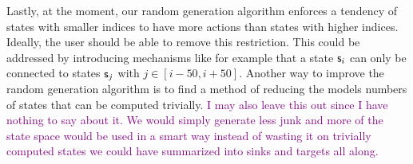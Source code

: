 Lastly, at the moment, our random generation algorithm enforces a tendency of states with smaller indices to have more actions than states with higher indices.
Ideally, the user should be able to remove this restriction.
This could be addressed by introducing mechanisms like for example that a state $\mathsf{s}_i$ can only be connected to states $\mathsf{s}_{j}$ with $j \in [i-50, i+50]$.
Another way to improve the random generation algorithm is to find a method of reducing the models numbers of states that can be computed trivially.
\textcolor{purple}{I may also leave this out since I have nothing to say about it. We would simply generate less junk and more of the state space
would be used in a smart way instead of wasting it on trivially computed states we could have summarized into sinks and targets all along.} 